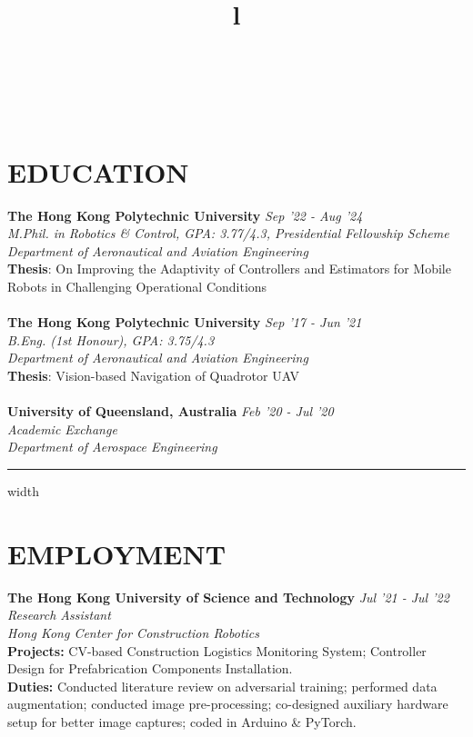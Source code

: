 \documentclass[overlapped]{res}
\begin{document}
\begin{resume}

\begin{format}
  \title{l}\\
  \body\\
\end{format}

\section{EDUCATION}
\textbf{The Hong Kong Polytechnic University} \hfill \textit{Sep '22 - Aug '24}\\
{\sl M.Phil. in Robotics \& Control, GPA: 3.77/4.3, Presidential Fellowship Scheme \\ 
Department of Aeronautical and Aviation Engineering}\\ 
\textbf{Thesis}: On Improving the Adaptivity of Controllers and Estimators for Mobile Robots in Challenging Operational Conditions
\\ \\ 
\textbf{The Hong Kong Polytechnic University} \hfill \textit{Sep '17 - Jun '21}\\
{\sl B.Eng. (1st Honour), GPA: 3.75/4.3\\ 
Department of Aeronautical and Aviation Engineering}\\ 
\textbf{Thesis}: Vision-based Navigation of Quadrotor UAV
\\ \\ 
\textbf{University of Queensland, Australia} \hfill \textit{Feb '20 - Jul '20}\\
{\sl Academic Exchange \\ 
Department of Aerospace Engineering}
\par\noindent\hrule width \linewidth %

\section{EMPLOYMENT}
\textbf{The Hong Kong University of Science and Technology} \hfill \textit{Jul '21 - Jul '22}\\
{\sl Research Assistant\\
Hong Kong Center for Construction Robotics}\\ 
\textbf{Projects:} CV-based Construction Logistics Monitoring System; Controller Design for Prefabrication Components Installation.\\
\textbf{Duties:} Conducted literature review on adversarial training; performed data augmentation; conducted image pre-processing; co-designed auxiliary hardware setup for better image captures; coded in Arduino \& PyTorch.


\end{resume}
\end{document}
